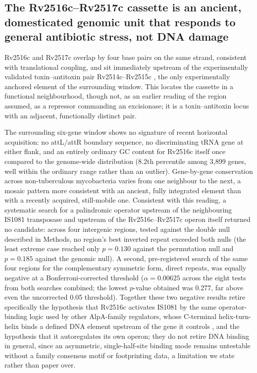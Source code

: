 \documentclass[11pt,a4paper]{article}
\begin{document}
\subsection{The Rv2516c--Rv2517c cassette is an ancient, domesticated genomic unit that responds to
general antibiotic stress, not DNA damage}

Rv2516c and Rv2517c overlap by four base pairs on the same strand, consistent with translational
coupling, and sit immediately upstream of the experimentally validated toxin--antitoxin pair
Rv2514c--Rv2515c \citep{tandon2019ta}, the only experimentally anchored element of the surrounding
window. This locates the cassette in a functional neighbourhood, though not, as an earlier reading
of the region assumed, as a repressor commanding an excisionase; it is a toxin--antitoxin locus with
an adjacent, functionally distinct pair.

The surrounding six-gene window shows no signature of recent horizontal acquisition: no attL/attR
boundary sequence, no discriminating tRNA gene at either flank, and an entirely ordinary GC content
for Rv2516c itself once compared to the genome-wide distribution (8.2th percentile among 3{,}899
genes, well within the ordinary range rather than an outlier). Gene-by-gene conservation across
non-tuberculous mycobacteria varies from one neighbour to the next, a mosaic pattern more consistent
with an ancient, fully integrated element than with a recently acquired, still-mobile one. Consistent
with this reading, a systematic search for a palindromic operator upstream of the neighbouring
IS1081 transposase and upstream of the Rv2516c--Rv2517c operon itself returned no candidate: across
four intergenic regions, tested against the double null described in Methods, no region's best
inverted repeat exceeded both nulls (the least extreme case reached only $p=0.130$ against the
permutation null and $p=0.185$ against the genomic null). A second, pre-registered search of the
same four regions for the complementary symmetric form, direct repeats, was equally negative at a
Bonferroni-corrected threshold ($\alpha=0.00625$ across the eight tests from both searches
combined; the lowest $p$-value obtained was 0.277, far above even the uncorrected 0.05 threshold).
Together these two negative results retire specifically the hypothesis that Rv2516c activates
IS1081 by the same operator-binding logic used by other AlpA-family regulators, whose C-terminal
helix-turn-helix binds a defined DNA element upstream of the gene it controls
\citep{wen2022alpa}, and the hypothesis that it autoregulates its own operon; they do not retire
DNA binding in general, since an asymmetric, single-half-site binding mode remains untestable
without a family consensus motif or footprinting data, a limitation we state rather than paper
over.
\end{document}
